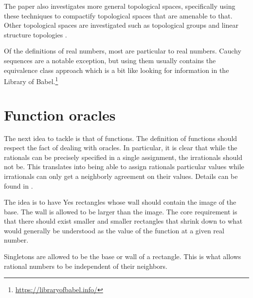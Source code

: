 \documentclass[12pt]{article}
\begin{document}
The paper also investigates more general topological spaces, specifically using these techniques to compactify topological spaces that are amenable to that. Other topological spaces are investigated such as topological groups and linear structure topologies \cite{maudlin}. 

Of the definitions of real numbers, most are particular to real numbers. Cauchy sequences are a notable exception, but using them usually contains the equivalence class approach which is a bit like looking for information in the Library of Babel.\footnote{\url{https://libraryofbabel.info/}} 


\section{Function oracles}

The next idea to tackle is that of functions. The definition of functions should respect the fact of dealing with oracles.  In particular, it is clear that while the rationals can be precisely specified in a single assignment, the irrationals should not be. This translates into being able to assign rationals particular values while irrationals can only get a neighborly agreement on their values. Details can be found in \cite{taylor23funora}.

The idea is to have Yes rectangles whose wall should contain the image of the base. The wall is allowed to be larger than the image. The core requirement is that there should exist smaller and smaller rectangles that shrink down to what would generally be understood as the value of the function at a given real number. 

Singletons are allowed to be the base or wall of a rectangle. This is what allows rational numbers to be independent of their neighbors.
\end{document}
